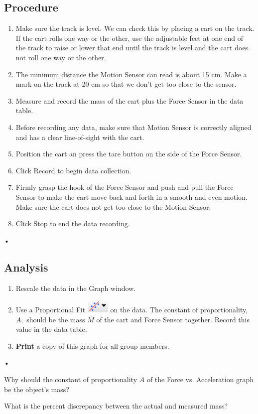 \documentclass[main.tex]{subfiles}
\begin{document}
\subsection*{Procedure}
\begin{enumerate}
\item
Make sure the track is level. We can check this by  placing a cart on the track. If the cart rolls one way or the other, use the adjustable feet at one end of the track to raise or lower that end until the track is level and the cart does not roll one way or the other.
\item
The minimum distance the Motion Sensor can read is about 15 cm. Make a mark on the track at 20 cm so that we don't get too close to the sensor.
\item
Measure and record the mass of the cart plus the Force Sensor in the data table.
\item
Before recording any data, make sure that Motion Sensor is correctly aligned and has a clear line-of-sight with the cart.
\item
Position the cart an press the tare button on the side of the Force Sensor.
\item
Click Record to begin data collection.
\item
Firmly grasp the hook of the Force Sensor and push and pull the Force Sensor to make the cart move back and forth in a smooth and even motion. Make sure the cart does not get too close to the Motion Sensor.
\item
Click Stop to end the data recording.
\end{enumerate}•

\subsection*{Analysis}
\begin{enumerate}
\item
Rescale the data in the Graph window.
\item
Use a Proportional Fit \includegraphics{Curve_Fit} on the data. The constant of proportionality, $A,$ should be the mass $M$ of the cart and Force Sensor together. Record this value in the data table.
\item
\textbf{Print} a copy of this graph for all group members.
\end{enumerate}•

\begin{question}
Why should the constant of proportionality $A$ of the Force vs. Acceleration graph be the object's mass?
\end{question}
\begin{question}
What is the percent discrepancy between the actual and measured mass?
\end{question}
\end{document}
